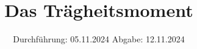 

\subject{V101}
\title{Das Trägheitsmoment}
\date{%
  Durchführung: 05.11.2024
  \hspace{3em}
  Abgabe: 12.11.2024
}



\maketitle
\thispagestyle{empty}
\tableofcontents
\newpage







\printbibliography{}


